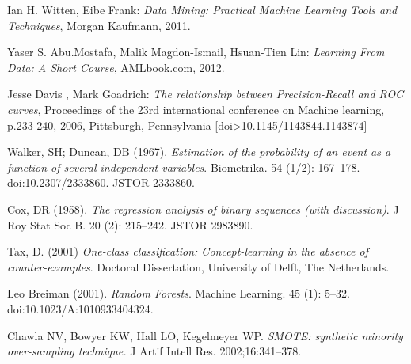 \begin{thebibliography}{9}
Ian H. Witten, Eibe Frank: \textit{Data Mining: Practical Machine Learning Tools and Techniques}, Morgan Kaufmann, 2011.

Yaser S. Abu.Mostafa, Malik Magdon-Ismail, Hsuan-Tien Lin: \textit{Learning From Data: A Short Course}, AMLbook.com, 2012.

Jesse Davis , Mark Goadrich: \textit{The relationship between Precision-Recall and ROC curves}, Proceedings of the 23rd international conference on Machine learning, p.233-240, 2006, Pittsburgh, Pennsylvania  [doi>10.1145/1143844.1143874] 

Walker, SH; Duncan, DB (1967). \textit{Estimation of the probability of an event as a function of several independent variables}. Biometrika. 54 (1/2): 167–178. doi:10.2307/2333860. JSTOR 2333860.

Cox, DR (1958). \textit{The regression analysis of binary sequences (with discussion)}. J Roy Stat Soc B. 20 (2): 215–242. JSTOR 2983890. 

Tax, D. (2001) \textit{One-class classification: Concept-learning in the absence of counter-examples}. Doctoral Dissertation, University of Delft, The Netherlands. 

Leo Breiman (2001). \textit{Random Forests}. Machine Learning. 45 (1): 5–32. doi:10.1023/A:1010933404324. 

Chawla NV, Bowyer KW, Hall LO, Kegelmeyer WP. \textit{SMOTE: synthetic minority over-sampling technique.} J Artif Intell Res. 2002;16:341–378.

\end{thebibliography}